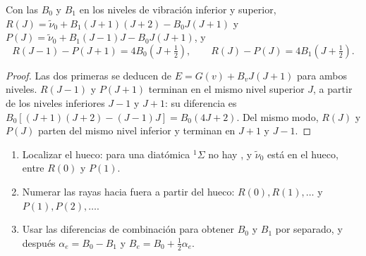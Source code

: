 \begin{theorem}\label{thm:b3:rovibrational-spectroscopy:combination-differences}
Con las  $B_0$ y $B_1$ en los niveles de vibración inferior y superior,
$R(J) = \tilde\nu_0 + B_1(J+1)(J+2) - B_0J(J+1)$ y $P(J) = \tilde\nu_0 +
B_1(J-1)J - B_0J(J+1)$, y
\[
R(J - 1) - P(J + 1) = 4B_0(J + \tfrac12), \qquad R(J) - P(J) = 4B_1(J + \tfrac12).
\]
\end{theorem}

\begin{proof}
Las dos primeras se deducen de $E = G(v) + B_vJ(J+1)$ para ambos niveles. $R(J - 1)$ y
$P(J + 1)$ terminan en el mismo nivel superior $J$, a partir de los niveles inferiores $J - 1$ y $J + 1$:
su diferencia es $B_0[(J+1)(J+2) - (J-1)J] = B_0(4J + 2)$. Del mismo modo, $R(J)$ y
$P(J)$ parten del mismo nivel inferior y terminan en $J + 1$ y $J - 1$.
\end{proof}

\begin{method}\label{met:b3:rovibrational-spectroscopy:combination}
\begin{enumerate}
  \item Localizar el hueco: para una diatómica ${}^1\Sigma$ no hay , y
        $\tilde\nu_0$ está en el hueco, entre $R(0)$ y $P(1)$.
  \item Numerar las rayas hacia fuera a partir del hueco: $R(0), R(1), \dots$ y $P(1),
        P(2), \dots$.
  \item Usar las diferencias de combinación para obtener $B_0$ y $B_1$
        por separado, y después $\alpha_e = B_0 - B_1$ y $B_e = B_0 + \frac12\alpha_e$.
\end{enumerate}
\end{method}

